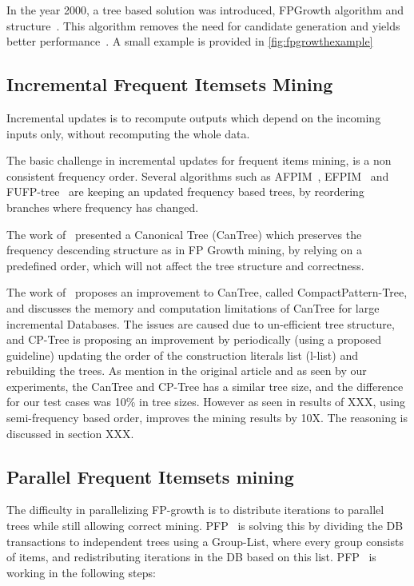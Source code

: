 In the year 2000, a tree based solution was introduced, FPGrowth algorithm and structure~\cite{agrawal1994fast}. This algorithm removes the need for candidate generation and yields better performance~\cite{hunyadi2011performance}. A small example is provided in \autoref{fig:fpgrowthexample}


\subsection{Incremental Frequent Itemsets Mining}
Incremental updates is to recompute outputs which depend on the incoming inputs only, without recomputing the whole data.

The basic challenge in incremental updates for frequent items mining, is a non consistent frequency order. Several algorithms such as AFPIM~\cite{koh2004efficient}, EFPIM~\cite{li2006fast} and FUFP-tree~\cite{hong2008incrementally} are keeping an updated frequency based trees, by reordering branches where frequency has changed.

The work of~\cite{leung2005cantree} presented a Canonical Tree (CanTree) which preserves the frequency descending structure as in FP Growth mining, by relying on a predefined order, which will not affect the tree structure and correctness.

	The work of~\cite{tanbeer2009efficient} proposes an improvement to CanTree, called CompactPattern-Tree, and discusses the memory and computation limitations of CanTree for large incremental Databases. The issues are caused due to un-efficient tree structure, and CP-Tree is proposing an improvement by periodically (using a proposed guideline) updating the order of the construction literals list (l-list) and rebuilding the trees. As mention in the original article and as seen by our experiments, the CanTree and CP-Tree has a similar tree size, and the difference for our test cases was 10\% in tree sizes. However as seen in results of XXX, using semi-frequency based order, improves the mining results by 10X. The reasoning is discussed in section XXX.
	
	

\subsection{Parallel Frequent Itemsets mining}
The difficulty in parallelizing FP-growth is to distribute iterations to parallel trees while still allowing correct mining. PFP~\cite{li2008pfp} is solving this by dividing the DB transactions to independent trees using a Group-List, where every group consists of items, and redistributing iterations in the DB based on this list.
PFP~\cite{li2008pfp} is working in the following steps:

